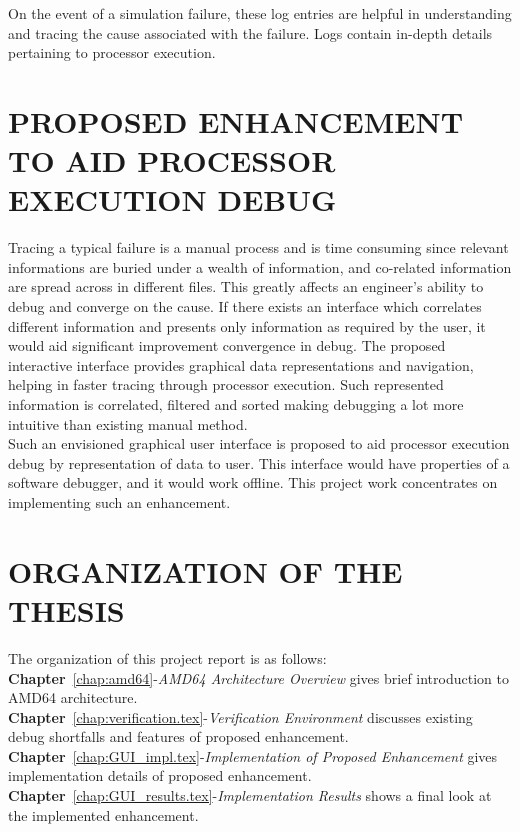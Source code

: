 On the event of a simulation failure, these log entries are helpful in understanding and tracing the cause associated with the failure. Logs contain in-depth details pertaining to processor execution. 

\section{PROPOSED ENHANCEMENT TO AID PROCESSOR EXECUTION DEBUG}
Tracing a typical failure is a manual process and is time consuming since relevant informations are buried under a wealth of information, and co-related information are spread across in different files. This greatly affects an engineer's ability to debug and converge on the cause. If there exists an interface which correlates different information and presents only information as required by the user, it would aid significant improvement convergence in debug. The proposed interactive interface provides graphical data representations and navigation, helping in faster tracing through processor execution. Such represented information is correlated, filtered and sorted making debugging a lot more intuitive than existing manual method.\\
Such an envisioned graphical user interface is proposed to aid processor execution debug by representation of data to user. This interface would have properties of a software debugger, and it would work offline. This project work concentrates on implementing such an enhancement.

 


\section{ORGANIZATION OF THE THESIS}
The organization of this project report is as follows:\\
\noindent 
{\bf Chapter}~\ref{chap:amd64}-{\it AMD64 Architecture Overview} gives brief introduction to AMD64 architecture.\\
{\bf Chapter}~\ref{chap:verification.tex}-{\it Verification Environment} discusses existing debug shortfalls and features of proposed enhancement.\\
{\bf Chapter}~\ref{chap:GUI_impl.tex}-{\it Implementation of Proposed Enhancement} gives implementation details of proposed enhancement.\\
{\bf Chapter}~\ref{chap:GUI_results.tex}-{\it Implementation Results} shows a final look at the implemented enhancement.\\

